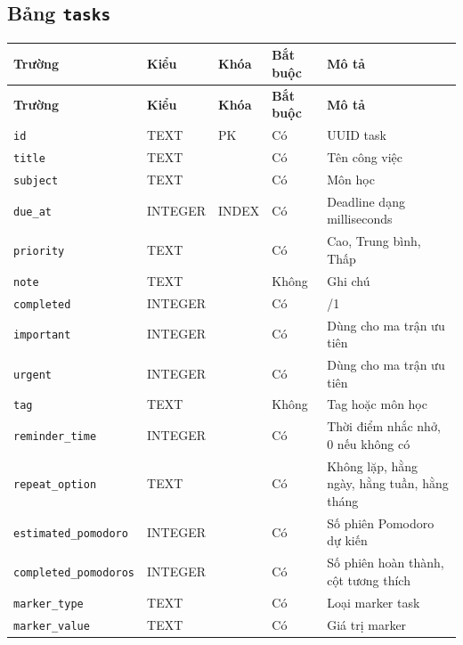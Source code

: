 \documentclass[12pt,a4paper]{report}
\begin{document}
\subsection{Bảng \texttt{tasks}}

\begin{longtable}{|>{\raggedright\arraybackslash}p{}|>{\raggedright\arraybackslash}p{}|>{\raggedright\arraybackslash}p{}|>{\raggedright\arraybackslash}p{}|>{\raggedright\arraybackslash}p{}|}
\hline
\textbf{Trường} & \textbf{Kiểu} & \textbf{Khóa} & \textbf{Bắt buộc} & \textbf{Mô tả} \\ \hline
\endfirsthead
\hline
\textbf{Trường} & \textbf{Kiểu} & \textbf{Khóa} & \textbf{Bắt buộc} & \textbf{Mô tả} \\ \hline
\endhead
\texttt{id} & TEXT & PK & Có & UUID task \\ \hline
\texttt{title} & TEXT &  & Có & Tên công việc \\ \hline
\texttt{subject} & TEXT &  & Có & Môn học \\ \hline
\texttt{due\_at} & INTEGER & INDEX & Có & Deadline dạng milliseconds \\ \hline
\texttt{priority} & TEXT &  & Có & Cao, Trung bình, Thấp \\ \hline
\texttt{note} & TEXT &  & Không & Ghi chú \\ \hline
\texttt{completed} & INTEGER &  & Có & 0/1 \\ \hline
\texttt{important} & INTEGER &  & Có & Dùng cho ma trận ưu tiên \\ \hline
\texttt{urgent} & INTEGER &  & Có & Dùng cho ma trận ưu tiên \\ \hline
\texttt{tag} & TEXT &  & Không & Tag hoặc môn học \\ \hline
\texttt{reminder\_time} & INTEGER &  & Có & Thời điểm nhắc nhở, 0 nếu không có \\ \hline
\texttt{repeat\_option} & TEXT &  & Có & Không lặp, hằng ngày, hằng tuần, hằng tháng \\ \hline
\texttt{estimated\_pomodoro} & INTEGER &  & Có & Số phiên Pomodoro dự kiến \\ \hline
\texttt{completed\_pomodoros} & INTEGER &  & Có & Số phiên hoàn thành, cột tương thích \\ \hline
\texttt{marker\_type} & TEXT &  & Có & Loại marker task \\ \hline
\texttt{marker\_value} & TEXT &  & Có & Giá trị marker \\ \hline
\end{longtable}
\end{document}
